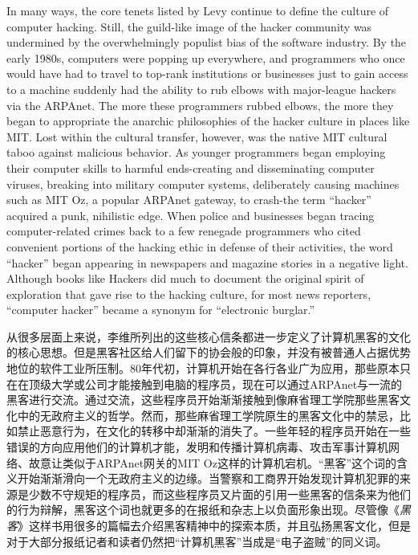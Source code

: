 \ifdefined\eng
In many ways, the core tenets listed by Levy continue to define the culture of computer hacking. Still, the guild-like image of the hacker community was undermined by the overwhelmingly populist bias of the software industry. By the early 1980s, computers were popping up everywhere, and programmers who once would have had to travel to top-rank institutions or businesses just to gain access to a machine suddenly had the ability to rub elbows with major-league hackers via the ARPAnet. The more these programmers rubbed elbows, the more they began to appropriate the anarchic philosophies of the hacker culture in places like MIT. Lost within the cultural transfer, however, was the native MIT cultural taboo against malicious behavior. As younger programmers began employing their computer skills to harmful ends-creating and disseminating computer viruses, breaking into military computer systems, deliberately causing machines such as MIT Oz, a popular ARPAnet gateway, to crash-the term ``hacker'' acquired a punk, nihilistic edge. When police and businesses began tracing computer-related crimes back to a few renegade programmers who cited convenient portions of the hacking ethic in defense of their activities, the word ``hacker'' began appearing in newspapers and magazine stories in a negative light. Although books like Hackers did much to document the original spirit of exploration that gave rise to the hacking culture, for most news reporters, ``computer hacker'' became a synonym for ``electronic burglar.''
\fi

\ifdefined\chs
从很多层面上来说，李维所列出的这些核心信条都进一步定义了计算机黑客的文化的核心思想。但是黑客社区给人们留下的协会般的印象，并没有被普通人占据优势地位的软件工业所压制。80年代初，计算机开始在各行各业广为应用，那些原本只在在顶级大学或公司才能接触到电脑的程序员，现在可以通过ARPAnet与一流的黑客进行交流。通过交流，这些程序员开始渐渐接触到像麻省理工学院那些黑客文化中的无政府主义的哲学。然而，那些麻省理工学院原生的黑客文化中的禁忌，比如禁止恶意行为，在文化的转移中却渐渐的消失了。一些年轻的程序员开始在一些错误的方向应用他们的计算机才能，发明和传播计算机病毒、攻击军事计算机网络、故意让类似于ARPAnet网关的MIT Oz这样的计算机宕机。``黑客''这个词的含义开始渐渐滑向一个无政府主义的边缘。当警察和工商界开始发现计算机犯罪的来源是少数不守规矩的程序员，而这些程序员又片面的引用一些黑客的信条来为他们的行为辩解，黑客这个词也就更多的在报纸和杂志上以负面形象出现。尽管像《\textit{黑客}》这样书用很多的篇幅去介绍黑客精神中的探索本质，并且弘扬黑客文化，但是对于大部分报纸记者和读者仍然把``计算机黑客''当成是``电子盗贼''的同义词。
\fi

